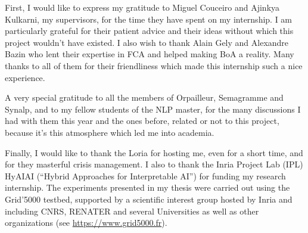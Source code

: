 
First, I would like to express my gratitude to Miguel Couceiro and Ajinkya Kulkarni, my supervisors, for the time they have spent on my internship.
I am particularly grateful for their patient advice and their ideas without which this project wouldn't have existed.
I also wish to thank Alain Gely and Alexandre Bazin who lent their expertise in FCA and helped making BoA a reality.
Many thanks to all of them for their friendliness which made this internship such a nice experience.

A very special gratitude to all the members of Orpailleur, Semagramme and Synalp, and to my fellow students of the NLP master, for the many discussions I had with them this year and the ones before, related or not to this project, because it's this atmosphere which led me into academia. 

Finally, I would like to thank the Loria for hosting me, even for a short time, and for they masterful crisis management.
I also to thank the Inria Project Lab (IPL) HyAIAI (``Hybrid Approaches for Interpretable AI'') for funding my research internship.
The experiments presented in my thesis were carried out using the Grid'5000 testbed, supported by a scientific interest group hosted by Inria and including CNRS, RENATER and several Universities as well as other organizations (see \url{https://www.grid5000.fr}).




